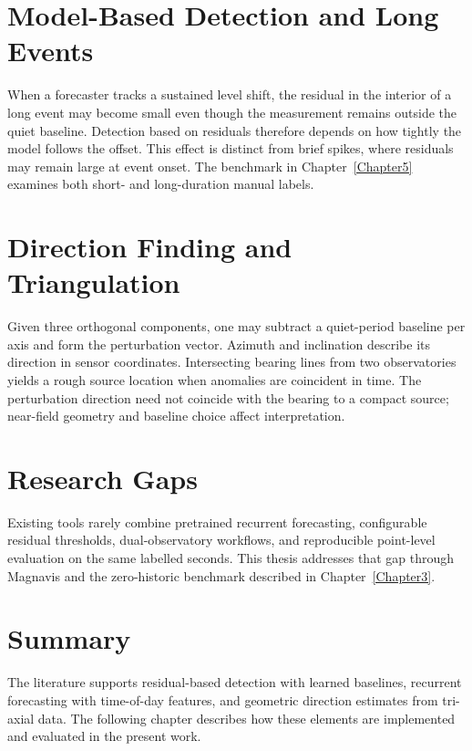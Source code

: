 \section{Model-Based Detection and Long Events}
When a forecaster tracks a sustained level shift, the residual in the interior of a long event may become small even though the measurement remains outside the quiet baseline. Detection based on residuals therefore depends on how tightly the model follows the offset. This effect is distinct from brief spikes, where residuals may remain large at event onset. The benchmark in Chapter~\ref{Chapter5} examines both short- and long-duration manual labels.

\section{Direction Finding and Triangulation}
Given three orthogonal components, one may subtract a quiet-period baseline per axis and form the perturbation vector. Azimuth and inclination describe its direction in sensor coordinates. Intersecting bearing lines from two observatories yields a rough source location when anomalies are coincident in time. The perturbation direction need not coincide with the bearing to a compact source; near-field geometry and baseline choice affect interpretation.

\section{Research Gaps}
Existing tools rarely combine pretrained recurrent forecasting, configurable residual thresholds, dual-observatory workflows, and reproducible point-level evaluation on the same labelled seconds. This thesis addresses that gap through Magnavis and the zero-historic benchmark described in Chapter~\ref{Chapter3}.

\section{Summary}
The literature supports residual-based detection with learned baselines, recurrent forecasting with time-of-day features, and geometric direction estimates from tri-axial data. The following chapter describes how these elements are implemented and evaluated in the present work.
